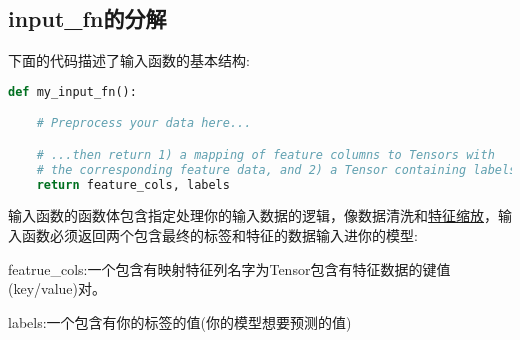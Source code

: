 \subsection{input\_fn的分解}
下面的代码描述了输入函数的基本结构:
\begin{lstlisting}[language=Python]
def my_input_fn():

    # Preprocess your data here...

    # ...then return 1) a mapping of feature columns to Tensors with
    # the corresponding feature data, and 2) a Tensor containing labels
    return feature_cols, labels
\end{lstlisting}
输入函数的函数体包含指定处理你的输入数据的逻辑，像数据清洗和\href{https://en.wikipedia.org/wiki/Feature_scaling}{特征缩放}，输入函数必须返回两个包含最终的标签和特征的数据输入进你的模型:

featrue\_cols:一个包含有映射特征列名字为Tensor包含有特征数据的键值(key/value)对。

labels:一个包含有你的标签的值(你的模型想要预测的值)
